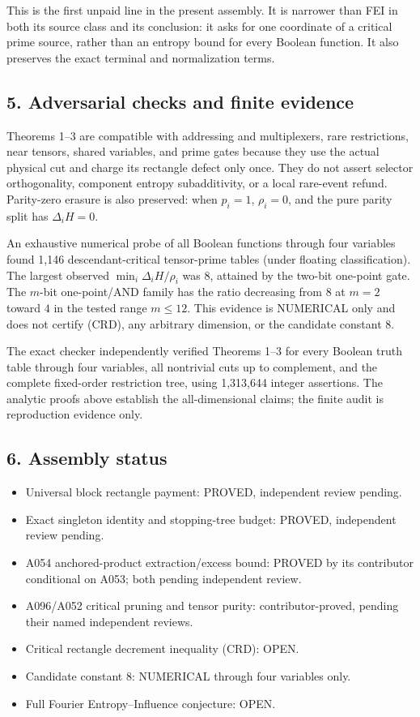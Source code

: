 This is the first unpaid line in the present assembly.  It is narrower than
FEI in both its source class and its conclusion: it asks for one coordinate of
a critical prime source, rather than an entropy bound for every Boolean
function.  It also preserves the exact terminal and normalization terms.

\subsection*{5. Adversarial checks and finite evidence}

Theorems 1--3 are compatible with addressing and multiplexers, rare
restrictions, near tensors, shared variables, and prime gates because they use
the actual physical cut and charge its rectangle defect only once.  They do
not assert selector orthogonality, component entropy subadditivity, or a local
rare-event refund.  Parity-zero erasure is also preserved: when $p_i=1$,
$\rho_i=0$, and the pure parity split has $\Delta_iH=0$.

An exhaustive numerical probe of all Boolean functions through four variables
found 1,146 descendant-critical tensor-prime tables (under floating
classification).  The largest observed
$\min_i\Delta_iH/\rho_i$ was $8$, attained by the two-bit one-point gate.
The $m$-bit one-point/AND family has the ratio decreasing from $8$ at $m=2$
toward $4$ in the tested range $m\le12$.  This evidence is NUMERICAL only and
does not certify (CRD), any arbitrary dimension, or the candidate constant
$8$.

The exact checker independently verified Theorems 1--3 for every Boolean
truth table through four variables, all nontrivial cuts up to complement, and
the complete fixed-order restriction tree, using 1,313,644 integer
assertions.  The analytic proofs above establish the all-dimensional claims;
the finite audit is reproduction evidence only.

\subsection*{6. Assembly status}

\begin{itemize}
\item Universal block rectangle payment: PROVED, independent review pending.
\item Exact singleton identity and stopping-tree budget: PROVED, independent
review pending.
\item A054 anchored-product extraction/excess bound: PROVED by its contributor
conditional on A053; both pending independent review.
\item A096/A052 critical pruning and tensor purity: contributor-proved,
pending their named independent reviews.
\item Critical rectangle decrement inequality (CRD): OPEN.
\item Candidate constant $8$: NUMERICAL through four variables only.
\item Full Fourier Entropy--Influence conjecture: OPEN.
\end{itemize}
